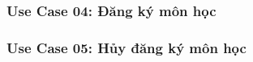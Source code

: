 \newpage
\subsubsection*{Use Case 04: Đăng ký môn học}
\begin{samepage}

\end{samepage}


\newpage
\subsubsection*{Use Case 05: Hủy đăng ký môn học}
\begin{samepage}

\end{samepage}

